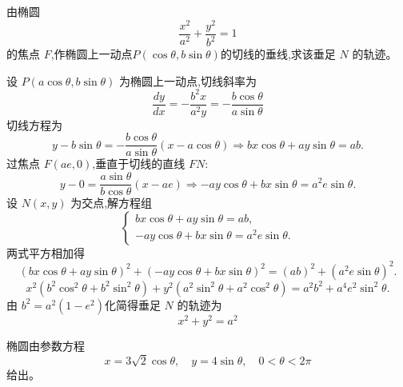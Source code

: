 \begin{questions}
    \question 由椭圆 
    \[
    \frac{x^2}{a^2}+\frac{y^2}{b^2}=1
    \]
    的焦点 $F$,作椭圆上一动点$P(\cos\theta, b\sin\theta)$的切线的垂线,求该垂足 $N$ 的轨迹。
    \begin{solution}
        设 $P(a\cos\theta, b\sin\theta)$ 为椭圆上一动点,切线斜率为
        \[
        \frac{dy}{dx} = -\frac{b^2 x}{a^2 y} = -\frac{b\cos\theta}{a\sin\theta}
        \]
        切线方程为
        \[
        y - b\sin\theta = -\frac{b\cos\theta}{a\sin\theta} (x - a\cos\theta) \Rightarrow bx\cos\theta + ay\sin\theta = ab.
        \]
        过焦点 $F(ae,0)$,垂直于切线的直线 $FN$:
        \[
        y - 0 = \frac{a\sin\theta}{b\cos\theta}(x - ae) \Rightarrow -ay\cos\theta + bx\sin\theta = a^2 e \sin\theta.
        \]
        设 $N(x,y)$ 为交点,解方程组
        \[
        \begin{cases}
        bx\cos\theta + ay\sin\theta = ab, \\
        - ay\cos\theta + bx\sin\theta = a^2 e \sin\theta.
        \end{cases}
        \]
        两式平方相加得
        \[
        (bx\cos\theta + ay\sin\theta)^2 + (-ay\cos\theta + bx\sin\theta)^2 = (ab)^2 + (a^2 e \sin\theta)^2.
        \]
        \[
        x^2(b^2\cos^2\theta + b^2\sin^2\theta) + y^2(a^2\sin^2\theta + a^2\cos^2\theta) = a^2 b^2 + a^4 e^2 \sin^2\theta.
        \]
        由 $b^2 = a^2(1-e^2)$化简得垂足 $N$ 的轨迹为
        \[
        x^2 + y^2 = a^2
        \]
    \end{solution}

    \question 椭圆由参数方程
    \[
    x=3\sqrt{2}\cos\theta,\quad y=4\sin\theta,\quad 0<\theta<2\pi
    \]
    给出。
\end{questions}
